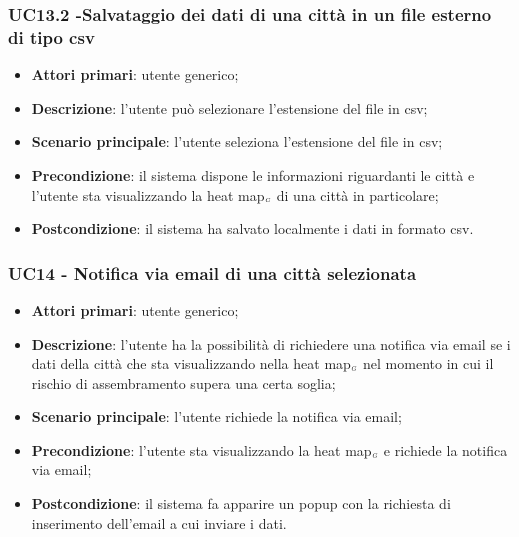 \subsubsection{UC13.2 -Salvataggio dei dati di una città in un file esterno di tipo csv}\label{CasiDUsoCasiDUsoFacoltativiTraUnUtenteEIlFrontEndElencoCasiDUsoUC132SalvataggioDeiDatiDiUnaCittaInUnFileEsternoDiTipoCsv}

\begin{itemize}
	\item \textbf{Attori primari}: utente generico;
	\item \textbf{Descrizione}: l’utente può selezionare l’estensione del file in csv;
	\item \textbf{Scenario principale}: l’utente seleziona l’estensione del file in csv;
	\item \textbf{Precondizione}: il sistema dispone le informazioni riguardanti le città e  l’utente sta visualizzando la heat map$_{\scaleto{G}{3pt}}$ di una città in particolare;
	\item \textbf{Postcondizione}: il sistema ha salvato localmente i dati in formato csv.
\end{itemize}

\subsubsection{UC14 - Notifica via email di una città selezionata}\label{CasiDUsoCasiDUsoFacoltativiTraUnUtenteEIlFrontEndElencoCasiDUsoUC14NotificaViaEmailDiUnaCittaSelezionata}

\begin{itemize}
	\item \textbf{Attori primari}: utente generico;
	\item \textbf{Descrizione}: l'utente ha la possibilità di richiedere una notifica via email se i dati della città che sta visualizzando nella heat map$_{\scaleto{G}{3pt}}$ nel momento in cui il rischio di assembramento supera una certa soglia;
	\item \textbf{Scenario principale}: l'utente richiede la notifica via email;
	\item \textbf{Precondizione}: l'utente sta visualizzando la heat map$_{\scaleto{G}{3pt}}$ e richiede la notifica via email;
	\item \textbf{Postcondizione}: il sistema fa apparire un popup con la richiesta di inserimento dell'email a cui inviare i dati.
\end{itemize}

